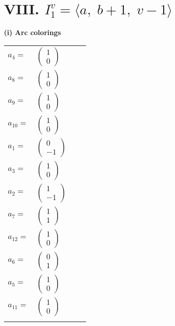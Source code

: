 \documentclass[1p]{elsarticle_modified}
\theoremstyle{definition}
\begin{document}
\centering \section*{VIII. $I^v_{1}= \langle a,\;b+1,\;v-1 \rangle$}
\flushleft \textbf{(i) Arc colorings}\\
\begin{tabular}{m{7pt} m{180pt} m{7pt} m{180pt} }
\flushright $a_{4}=$&$\begin{pmatrix}1\\0\end{pmatrix}$ \\
\flushright $a_{8}=$&$\begin{pmatrix}1\\0\end{pmatrix}$ \\
\flushright $a_{9}=$&$\begin{pmatrix}1\\0\end{pmatrix}$ \\
\flushright $a_{10}=$&$\begin{pmatrix}1\\0\end{pmatrix}$ \\
\flushright $a_{1}=$&$\begin{pmatrix}0\\-1\end{pmatrix}$ \\
\flushright $a_{3}=$&$\begin{pmatrix}1\\0\end{pmatrix}$ \\
\flushright $a_{2}=$&$\begin{pmatrix}1\\-1\end{pmatrix}$ \\
\flushright $a_{7}=$&$\begin{pmatrix}1\\1\end{pmatrix}$ \\
\flushright $a_{12}=$&$\begin{pmatrix}1\\0\end{pmatrix}$ \\
\flushright $a_{6}=$&$\begin{pmatrix}0\\1\end{pmatrix}$ \\
\flushright $a_{5}=$&$\begin{pmatrix}1\\0\end{pmatrix}$ \\
\flushright $a_{11}=$&$\begin{pmatrix}1\\0\end{pmatrix}$\\&\end{tabular}
\end{document}
